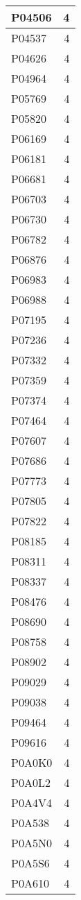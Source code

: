 \documentclass[
]{book}
\theoremstyle{definition}
\theoremstyle{definition}
\theoremstyle{definition}
\theoremstyle{definition}
\theoremstyle{remark}
\begin{document}
\begin{table}
\begin{tabular}{l|r}
\hline
P04506 & 4\\
\hline
P04537 & 4\\
\hline
P04626 & 4\\
\hline
P04964 & 4\\
\hline
P05769 & 4\\
\hline
P05820 & 4\\
\hline
P06169 & 4\\
\hline
P06181 & 4\\
\hline
P06681 & 4\\
\hline
P06703 & 4\\
\hline
P06730 & 4\\
\hline
P06782 & 4\\
\hline
P06876 & 4\\
\hline
P06983 & 4\\
\hline
P06988 & 4\\
\hline
P07195 & 4\\
\hline
P07236 & 4\\
\hline
P07332 & 4\\
\hline
P07359 & 4\\
\hline
P07374 & 4\\
\hline
P07464 & 4\\
\hline
P07607 & 4\\
\hline
P07686 & 4\\
\hline
P07773 & 4\\
\hline
P07805 & 4\\
\hline
P07822 & 4\\
\hline
P08185 & 4\\
\hline
P08311 & 4\\
\hline
P08337 & 4\\
\hline
P08476 & 4\\
\hline
P08690 & 4\\
\hline
P08758 & 4\\
\hline
P08902 & 4\\
\hline
P09029 & 4\\
\hline
P09038 & 4\\
\hline
P09464 & 4\\
\hline
P09616 & 4\\
\hline
P0A0K0 & 4\\
\hline
P0A0L2 & 4\\
\hline
P0A4V4 & 4\\
\hline
P0A538 & 4\\
\hline
P0A5N0 & 4\\
\hline
P0A5S6 & 4\\
\hline
P0A610 & 4\\

\end{tabular}
\end{table}
\end{document}
